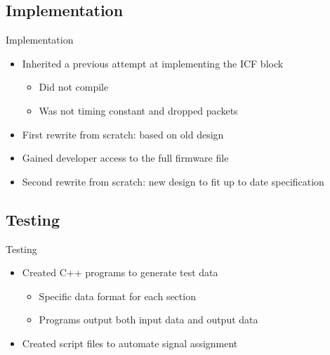 \documentclass{beamer}
\begin{document}
\subsection{Implementation}
\begin{frame}{Implementation}
  \begin{itemize}
    \item
      Inherited a previous attempt at implementing the ICF block
      \begin{itemize}
        \item Did not compile
        \item Was not timing constant and dropped packets
      \end{itemize}
    \item
      First rewrite from scratch: based on old design
    \item
      Gained developer access to the full firmware file
    \item
      Second rewrite from scratch: new design to fit up to date specification
  \end{itemize}
\end{frame}

\subsection{Testing}
\begin{frame}{Testing}
  \begin{itemize}
    \item
      Created C++ programs to generate test data
      \begin{itemize}
        \item Specific data format for each section
        \item Programs output both input data and output data
      \end{itemize}

    \item
      Created script files to automate signal assignment
  \end{itemize}
\end{frame}
\end{document}

